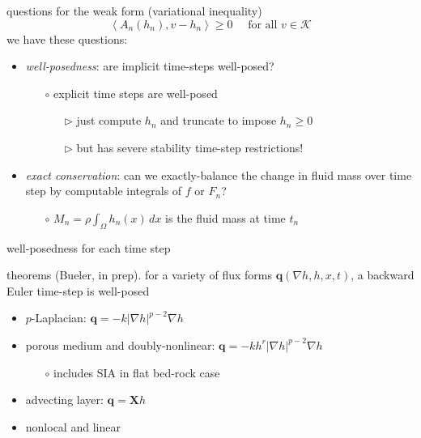 \documentclass[hide notes,intlimits]{beamer}
\newcommand{\Kcal}{\mathcal{K}}
\newcommand{\bX}{\mathbf{X}}
\newcommand{\bq}{\mathbf{q}}
\newcommand{\grad}{\nabla}
\newcommand{\ip}[2]{\ensuremath{\left<#1,#2\right>}}
\begin{document}
\begin{frame}{questions}
for the weak form (variational inequality)
  $$\ip{A_n(h_n)}{v-h_n} \ge 0 \quad \text{ for all } v \in \Kcal$$
we have these questions:

\begin{itemize}
\item \emph{well-posedness}: are implicit time-steps well-posed?
    \begin{itemize}
    \item[$\circ$] explicit time steps are well-posed
       \begin{itemize}
       \item[$\triangleright$] just compute $h_n$ and truncate to impose $h_n\ge 0$
       \item[$\triangleright$] but has severe stability time-step restrictions!
       \end{itemize}
    \end{itemize}
\item \emph{exact conservation}: can we exactly-balance the change in fluid mass over time step by computable integrals of $f$ or $F_n$?
    \begin{itemize}
    \item[$\circ$] $M_n = \rho \int_\Omega h_n(x)\,dx$ is the fluid mass at time $t_n$
    \end{itemize}
\end{itemize}
\end{frame}


\begin{frame}{well-posedness for each time step}

\begin{block}{theorems (Bueler, in prep).}
for a variety of flux forms $\bq(\grad h,h,x,t)$, a backward Euler time-step is well-posed

\begin{itemize}
\item $p$-Laplacian: $\bq=-k|\grad h|^{p-2}\grad h$
\item porous medium and doubly-nonlinear: $\bq=-k h^r |\grad h|^{p-2}\grad h$
    \begin{itemize}
    \item[$\circ$] includes SIA in flat bed-rock case
    \end{itemize}
\item advecting layer: $\bq = \bX h$
\item nonlocal and linear
\end{itemize}
\end{block}
\end{frame}
\end{document}
